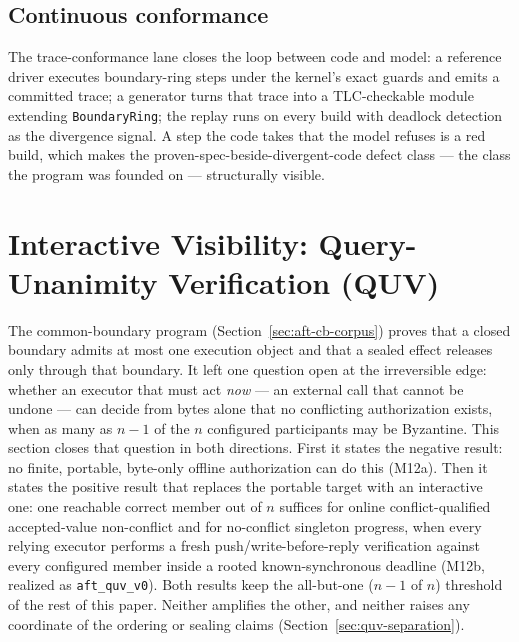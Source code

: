 \documentclass[11pt]{article}
\newcommand{\code}[1]{\texttt{#1}}
\begin{document}
\subsection{Continuous conformance}

The trace-conformance lane closes the loop between code and model: a
reference driver executes boundary-ring steps under the kernel's exact
guards and emits a committed trace; a generator turns that trace into a
TLC-checkable module extending \code{BoundaryRing}; the replay runs on
every build with deadlock detection as the divergence signal. A step the
code takes that the model refuses is a red build, which makes the
proven-spec-beside-divergent-code defect class --- the class the program
was founded on --- structurally visible.

\section{Interactive Visibility: Query-Unanimity Verification (QUV)}
\label{sec:quv}

The common-boundary program (Section~\ref{sec:aft-cb-corpus}) proves that a
closed boundary admits at most one execution object and that a sealed effect
releases only through that boundary. It left one question open at the
irreversible edge: whether an executor that must act \emph{now} --- an
external call that cannot be undone --- can decide from bytes alone that no
conflicting authorization exists, when as many as \(n-1\) of the \(n\)
configured participants may be Byzantine. This section closes that question
in both directions. First it states the negative result: no finite, portable,
byte-only offline authorization can do this (M12a). Then it states the
positive result that replaces the portable target with an interactive one:
one reachable correct member out of \(n\) suffices for online
conflict-qualified accepted-value non-conflict and for no-conflict singleton
progress, when every relying executor performs a fresh push/write-before-reply
verification against every configured member inside a rooted known-synchronous
deadline (M12b, realized as \code{aft\_quv\_v0}). Both results keep the
all-but-one (\(n-1\) of \(n\)) threshold of the rest of this paper. Neither
amplifies the other, and neither raises any coordinate of the ordering or
sealing claims (Section~\ref{sec:quv-separation}).
\end{document}
